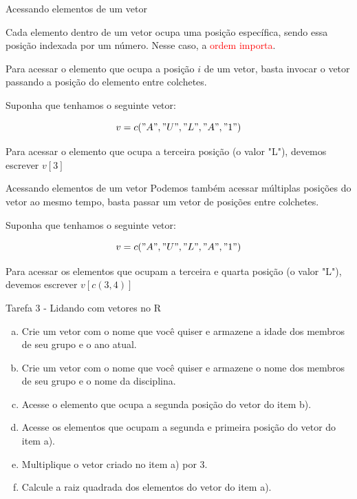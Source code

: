 \documentclass{beamer}
\begin{document}
\begin{frame}{Acessando elementos de um vetor}

  Cada elemento dentro de um vetor ocupa uma posição específica, sendo essa posição indexada por um número. Nesse caso, 
  a \textcolor{red}{ordem importa}.

Para acessar o elemento que ocupa a posição $i$ de um vetor, basta invocar o vetor passando a posição do elemento entre colchetes. 

\begin{exemplo}
Suponha que tenhamos o seguinte vetor:

$$v = c("A", "U", "L", "A", "1")$$

Para acessar o elemento que ocupa a terceira posição (o valor "L"), devemos escrever $v[3]$
\end{exemplo}
\end{frame}

\begin{frame}{Acessando elementos de um vetor}
 Podemos também acessar múltiplas posições do vetor ao mesmo tempo, basta passar um vetor de posições entre colchetes. 

 \begin{exemplo}
Suponha que tenhamos o seguinte vetor:

$$v = c("A", "U", "L", "A", "1")$$

Para acessar os elementos que ocupam a terceira e quarta posição (o valor "L"), devemos escrever $v[c(3,4)]$
\end{exemplo}

\end{frame}
\begin{frame}{Tarefa 3 - Lidando com vetores no R}

  \begin{exercicio}
    \begin{enumerate}[a)]
      \item Crie um vetor com o nome que você quiser e armazene a idade dos membros de seu grupo e o ano atual.
      \item Crie um vetor com o nome que você quiser e armazene o nome dos membros de seu grupo e o nome da disciplina.
      \item Acesse o elemento que ocupa a segunda posição do vetor do item b).
      \item Acesse os elementos que ocupam a segunda e primeira posição do vetor do item a). 
      \item Multiplique o vetor criado no item a) por 3. 
      \item Calcule a raiz quadrada dos elementos do vetor do item a). 
    \end{enumerate}
  \end{exercicio}
\end{frame}
\end{document}
